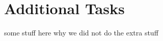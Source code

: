 \chapter{Additional Tasks}
\label{cha:additionalTasks}

some stuff here why we did not do the extra stuff
